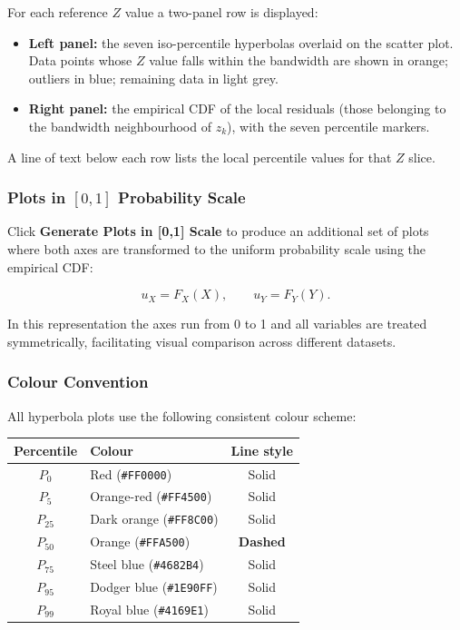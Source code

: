 \documentclass[12pt,a4paper]{article}
\begin{document}
For each reference $Z$ value a two-panel row is displayed:
\begin{itemize}[leftmargin=1.5em]
    \item \textbf{Left panel:} the seven iso-percentile hyperbolas overlaid on the
          scatter plot.  Data points whose $Z$ value falls within the bandwidth
          are shown in orange; outliers in blue; remaining data in light grey.
    \item \textbf{Right panel:} the empirical CDF of the local residuals (those
          belonging to the bandwidth neighbourhood of $z_k$), with the seven
          percentile markers.
\end{itemize}

A line of text below each row lists the local percentile values for that $Z$ slice.

\subsubsection{Plots in \texorpdfstring{$[0,1]$}{[0,1]} Probability Scale}

Click \textbf{Generate Plots in [0,1] Scale} to produce an additional set of plots
where both axes are transformed to the uniform probability scale using the empirical
CDF:

\[
    u_X = F_X(X), \qquad u_Y = F_Y(Y).
\]

In this representation the axes run from 0 to 1 and all variables are treated
symmetrically, facilitating visual comparison across different datasets.

\subsubsection{Colour Convention}

All hyperbola plots use the following consistent colour scheme:

\begin{center}
\renewcommand{\arraystretch}{1.2}
\begin{tabular}{@{}clc@{}}
\toprule
\textbf{Percentile} & \textbf{Colour} & \textbf{Line style} \\
\midrule
$P_0$   & Red (\texttt{\#FF0000})      & Solid \\
$P_5$   & Orange-red (\texttt{\#FF4500}) & Solid \\
$P_{25}$ & Dark orange (\texttt{\#FF8C00}) & Solid \\
$P_{50}$ & Orange (\texttt{\#FFA500})    & \textbf{Dashed} \\
$P_{75}$ & Steel blue (\texttt{\#4682B4}) & Solid \\
$P_{95}$ & Dodger blue (\texttt{\#1E90FF}) & Solid \\
$P_{99}$ & Royal blue (\texttt{\#4169E1}) & Solid \\
\bottomrule
\end{tabular}
\end{center}
\end{document}
